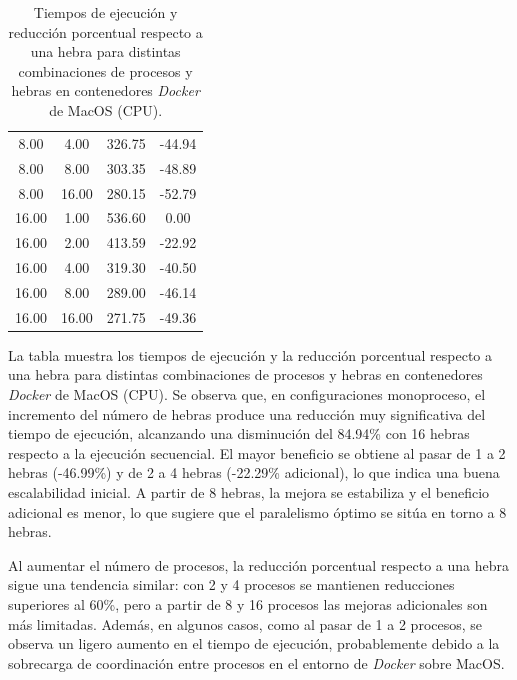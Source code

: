 \begin{table}[ht]
\begin{tabular}{|c|c|c|c|}
        8.00              & 4.00            & 326.75              & -44.94                         \\
        8.00              & 8.00            & 303.35              & -48.89                         \\
        8.00              & 16.00           & 280.15              & -52.79                         \\
        16.00             & 1.00            & 536.60              & 0.00                           \\
        16.00             & 2.00            & 413.59              & -22.92                         \\
        16.00             & 4.00            & 319.30              & -40.50                         \\
        16.00             & 8.00            & 289.00              & -46.14                         \\
        16.00             & 16.00           & 271.75              & -49.36                         \\
        \hline
    \end{tabular}
    \caption{Tiempos de ejecución y reducción porcentual respecto a una hebra para distintas combinaciones de procesos y hebras en contenedores \textit{Docker} de MacOS (CPU).}
    \label{tab:thread_sweep_mac_docker_time}
\end{table}

La tabla muestra los tiempos de ejecución y la reducción porcentual respecto a una hebra para distintas combinaciones de procesos y hebras en contenedores \textit{Docker} de MacOS (CPU). Se observa que, en configuraciones monoproceso, el incremento del número de hebras produce una reducción muy significativa del tiempo de ejecución, alcanzando una disminución del 84.94\% con 16 hebras respecto a la ejecución secuencial. El mayor beneficio se obtiene al pasar de 1 a 2 hebras (-46.99\%) y de 2 a 4 hebras (-22.29\% adicional), lo que indica una buena escalabilidad inicial. A partir de 8 hebras, la mejora se estabiliza y el beneficio adicional es menor, lo que sugiere que el paralelismo óptimo se sitúa en torno a 8 hebras.

Al aumentar el número de procesos, la reducción porcentual respecto a una hebra sigue una tendencia similar: con 2 y 4 procesos se mantienen reducciones superiores al 60\%, pero a partir de 8 y 16 procesos las mejoras adicionales son más limitadas. Además, en algunos casos, como al pasar de 1 a 2 procesos, se observa un ligero aumento en el tiempo de ejecución, probablemente debido a la sobrecarga de coordinación entre procesos en el entorno de \textit{Docker} sobre MacOS.

